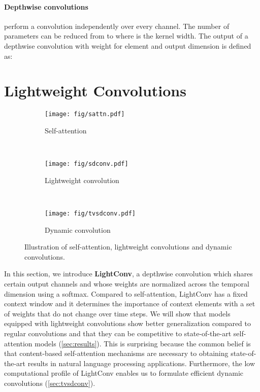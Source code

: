 \documentclass{article} \usepackage{iclr2019_conference,times}
\newcommand{\newterm}[1]{{\bf #1}}
\def\Sdconvfull{Lightweight convolution}
\def\sdconvfull{lightweight convolution}
\def\sdconv{LightConv}
\def\tvsdconvfull{dynamic convolution}
\begin{document}
\paragraph{Depthwise convolutions} perform a convolution independently over every channel. The number of parameters can be reduced from  to  where  is the kernel width.
The output  of a depthwise convolution with weight  for element  and output dimension  is defined as:




%
 

\section{Lightweight Convolutions}\label{sec:sdconv}
\begin{figure}[t]
\centering
\begin{subfigure}[b]{0.35\textwidth}
\centering
\texttt{[image: fig/sattn.pdf]}
\caption{Self-attention}
\label{fig:sattn}
\end{subfigure}
~ \begin{subfigure}[b]{0.3\textwidth}
\centering
\texttt{[image: fig/sdconv.pdf]}
\caption{\Sdconvfull{}}
\label{fig:sdconv}
\end{subfigure}
~ \begin{subfigure}[b]{0.3\textwidth}
\centering
\texttt{[image: fig/tvsdconv.pdf]}
\caption{Dynamic convolution}
\label{fig:tvsdconv}
\end{subfigure}
\caption{Illustration of self-attention, \sdconvfull{}s and \tvsdconvfull{}s.}
\label{fig:architectures}
\end{figure}


In this section, we introduce \newterm{\sdconv{}}, a depthwise convolution which shares certain output channels and whose weights are normalized across the temporal dimension using a softmax. 
Compared to self-attention, \sdconv{} has a fixed context window and it determines the importance of context elements with a set of weights that do not change over time steps.
We will show that models equipped with \sdconvfull{}s show better generalization compared to regular convolutions and that they can be competitive to state-of-the-art self-attention models (\textsection\ref{sec:results}). 
This is surprising because the common belief is that content-based self-attention mechanisms are necessary to obtaining state-of-the-art results in natural language processing applications.
Furthermore, the low computational profile of \sdconv{} enables us to formulate efficient \tvsdconvfull{}s (\textsection\ref{sec:tvsdconv}).
\end{document}
